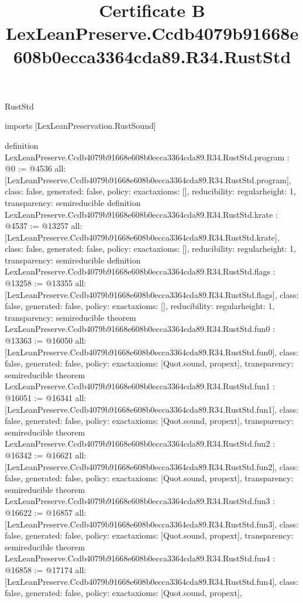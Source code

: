 \begin{lexlean}{RustStd}
\title{Certificate B LexLeanPreserve.Ccdb4079b91668e608b0ecca3364cda89.R34.RustStd}
\begin{coremodule}
imports [LexLeanPreservation.RustSound]

definition LexLeanPreserve.Ccdb4079b91668e608b0ecca3364cda89.R34.RustStd.program : @0 := @4536 {
  all: [LexLeanPreserve.Ccdb4079b91668e608b0ecca3364cda89.R34.RustStd.program],
  class: false,
  generated: false,
  policy: exact{axioms: []},
  reducibility: regular{height: 1},
  transparency: semireducible
}
definition LexLeanPreserve.Ccdb4079b91668e608b0ecca3364cda89.R34.RustStd.krate : @4537 := @13257 {
  all: [LexLeanPreserve.Ccdb4079b91668e608b0ecca3364cda89.R34.RustStd.krate],
  class: false,
  generated: false,
  policy: exact{axioms: []},
  reducibility: regular{height: 1},
  transparency: semireducible
}
definition LexLeanPreserve.Ccdb4079b91668e608b0ecca3364cda89.R34.RustStd.flags : @13258 := @13355 {
  all: [LexLeanPreserve.Ccdb4079b91668e608b0ecca3364cda89.R34.RustStd.flags],
  class: false,
  generated: false,
  policy: exact{axioms: []},
  reducibility: regular{height: 1},
  transparency: semireducible
}
theorem LexLeanPreserve.Ccdb4079b91668e608b0ecca3364cda89.R34.RustStd.fun0 : @13363 := @16050 {
  all: [LexLeanPreserve.Ccdb4079b91668e608b0ecca3364cda89.R34.RustStd.fun0],
  class: false,
  generated: false,
  policy: exact{axioms: [Quot.sound, propext]},
  transparency: semireducible
}
theorem LexLeanPreserve.Ccdb4079b91668e608b0ecca3364cda89.R34.RustStd.fun1 : @16051 := @16341 {
  all: [LexLeanPreserve.Ccdb4079b91668e608b0ecca3364cda89.R34.RustStd.fun1],
  class: false,
  generated: false,
  policy: exact{axioms: [Quot.sound, propext]},
  transparency: semireducible
}
theorem LexLeanPreserve.Ccdb4079b91668e608b0ecca3364cda89.R34.RustStd.fun2 : @16342 := @16621 {
  all: [LexLeanPreserve.Ccdb4079b91668e608b0ecca3364cda89.R34.RustStd.fun2],
  class: false,
  generated: false,
  policy: exact{axioms: [Quot.sound, propext]},
  transparency: semireducible
}
theorem LexLeanPreserve.Ccdb4079b91668e608b0ecca3364cda89.R34.RustStd.fun3 : @16622 := @16857 {
  all: [LexLeanPreserve.Ccdb4079b91668e608b0ecca3364cda89.R34.RustStd.fun3],
  class: false,
  generated: false,
  policy: exact{axioms: [Quot.sound, propext]},
  transparency: semireducible
}
theorem LexLeanPreserve.Ccdb4079b91668e608b0ecca3364cda89.R34.RustStd.fun4 : @16858 := @17174 {
  all: [LexLeanPreserve.Ccdb4079b91668e608b0ecca3364cda89.R34.RustStd.fun4],
  class: false,
  generated: false,
  policy: exact{axioms: [Quot.sound, propext]},
}
\end{coremodule}
\end{lexlean}
